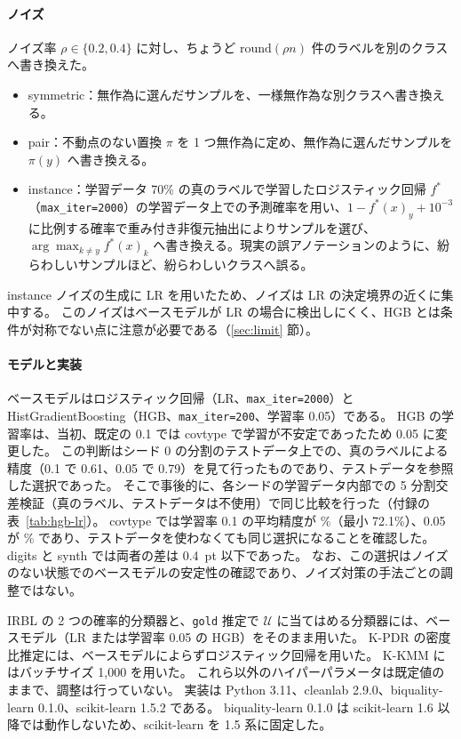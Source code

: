 \documentclass[a4paper,10pt]{ltjsarticle}
\newcommand{\cl}{\textsf{cleanlab}}
\newcommand{\bq}{\textsf{biquality-learn}}
\begin{document}
\paragraph{ノイズ}
ノイズ率 $\rho \in \{0.2, 0.4\}$ に対し、ちょうど $\mathrm{round}(\rho n)$ 件のラベルを別のクラスへ書き換えた。
\begin{itemize}
  \item symmetric：無作為に選んだサンプルを、一様無作為な別クラスへ書き換える。
  \item pair：不動点のない置換 $\pi$ を 1 つ無作為に定め、無作為に選んだサンプルを $\pi(y)$ へ書き換える。
  \item instance：学習データ 70\% の真のラベルで学習したロジスティック回帰 $f^*$（\texttt{max\_iter=2000}）の学習データ上での予測確率を用い、$1 - f^*(x)_y + 10^{-3}$ に比例する確率で重み付き非復元抽出によりサンプルを選び、$\arg\max_{k \neq y} f^*(x)_k$ へ書き換える。現実の誤アノテーションのように、紛らわしいサンプルほど、紛らわしいクラスへ誤る。
\end{itemize}
instance ノイズの生成に LR を用いたため、ノイズは LR の決定境界の近くに集中する。
このノイズはベースモデルが LR の場合に検出しにくく、HGB とは条件が対称でない点に注意が必要である（\ref{sec:limit} 節）。

\paragraph{モデルと実装}
ベースモデルはロジスティック回帰（LR、\texttt{max\_iter=2000}）と HistGradientBoosting（HGB、\texttt{max\_iter=200}、学習率 0.05）である。
HGB の学習率は、当初、既定の 0.1 では covtype で学習が不安定であったため 0.05 に変更した。
この判断はシード 0 の分割のテストデータ上での、真のラベルによる精度（0.1 で 0.61、0.05 で 0.79）を見て行ったものであり、テストデータを参照した選択であった。
そこで事後的に、各シードの学習データ内部での 5 分割交差検証（真のラベル、テストデータは不使用）で同じ比較を行った（付録の表~\ref{tab:hgb-lr}）。
covtype では学習率 0.1 の平均精度が \CovLRHigh\%（最小 72.1\%）、0.05 が \CovLRLow\% であり、テストデータを使わなくても同じ選択になることを確認した。
digits と synth では両者の差は 0.4~pt 以下であった。
なお、この選択はノイズのない状態でのベースモデルの安定性の確認であり、ノイズ対策の手法ごとの調整ではない。

IRBL の 2 つの確率的分類器と、\texttt{gold} 推定で $\mathcal{U}$ に当てはめる分類器には、ベースモデル（LR または学習率 0.05 の HGB）をそのまま用いた。
K-PDR の密度比推定には、ベースモデルによらずロジスティック回帰を用いた。
K-KMM にはバッチサイズ 1,000 を用いた。
これら以外のハイパーパラメータは既定値のままで、調整は行っていない。
実装は Python 3.11、\cl{} 2.9.0、\bq{} 0.1.0、scikit-learn 1.5.2 である。
\bq{} 0.1.0 は scikit-learn 1.6 以降では動作しないため、scikit-learn を 1.5 系に固定した。
\end{document}
